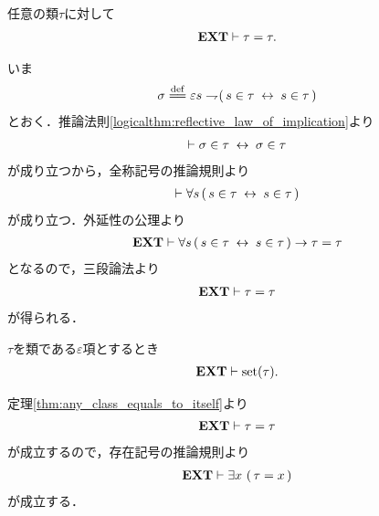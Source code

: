 	\begin{screen}
		\begin{thm}[任意の類は自分自身と等しい]
			\label{thm:any_class_equals_to_itself}
			任意の類$\tau$に対して
			\begin{align}
				\mbox{{\bf EXT}} \vdash \tau = \tau.
			\end{align}
		\end{thm}
	\end{screen}
	
	\begin{sketch}
		いま
		\begin{align}
			\sigma \defeq 
			\varepsilon s \negation (\, s \in \tau \lrarrow s \in \tau\, )
		\end{align}
		とおく．推論法則\ref{logicalthm:reflective_law_of_implication}より
		\begin{align}
			\vdash \sigma \in \tau \hspace{0.25em}\leftrightarrow\hspace{0.25em} \sigma \in \tau
		\end{align}
		が成り立つから，全称記号の推論規則より
		\begin{align}
			\vdash \forall s\, (\, s \in \tau  \hspace{0.25em}\leftrightarrow\hspace{0.25em} s \in \tau\, )
		\end{align}
		が成り立つ．外延性の公理より
		\begin{align}
			\mbox{{\bf EXT}} \vdash \forall s\, (\, s \in \tau  \hspace{0.25em}\leftrightarrow\hspace{0.25em} s \in \tau\, )
			\rightarrow \tau = \tau
		\end{align}
		となるので，三段論法より
		\begin{align}
			\mbox{{\bf EXT}} \vdash \tau = \tau
		\end{align}
		が得られる．
		\QED
	\end{sketch}
	
	\begin{screen}
		\begin{thm}
			$\tau$を類である$\varepsilon$項とするとき
			\begin{align}
				\mbox{{\bf EXT}} \vdash \operatorname*{set} (\tau).
			\end{align}
		\end{thm}
	\end{screen}
	
	\begin{sketch}
		定理\ref{thm:any_class_equals_to_itself}より
		\begin{align}
			\mbox{{\bf EXT}} \vdash \tau = \tau
		\end{align}
		が成立するので，存在記号の推論規則より
		\begin{align}
			\mbox{{\bf EXT}} \vdash \exists x\, \left(\, \tau = x\, \right)
		\end{align}
		が成立する．
		\QED
	\end{sketch}
	
